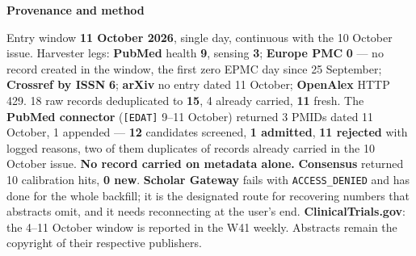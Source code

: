 \documentclass[10pt]{article}
\begin{document}


\vspace{2mm}

\begin{keybox}
{\sffamily\bfseries\footnotesize\color{Deep}Provenance and method}\\[1.2mm]
{\fontsize{7.2}{8.8}\selectfont
Entry window \textbf{11 October 2026}, single day, continuous with the 10 October issue.
Harvester legs: \textbf{PubMed} health \textbf{9}, sensing \textbf{3}; \textbf{Europe PMC} \textbf{0} ---
no record created in the window, the first zero EPMC day since 25 September; \textbf{Crossref by ISSN}
\textbf{6}; \textbf{arXiv} no entry dated 11 October; \textbf{OpenAlex} HTTP 429. 18 raw records
deduplicated to \textbf{15}, 4 already carried, \textbf{11} fresh. The \textbf{PubMed connector}
(\texttt{[EDAT]} 9--11 October) returned 3 PMIDs dated 11 October, 1 appended --- \textbf{12} candidates
screened, \textbf{1 admitted}, \textbf{11 rejected} with logged reasons, two of them duplicates of records
already carried in the 10 October issue. \textbf{No record carried on metadata alone.} \textbf{Consensus}
returned 10 calibration hits, \textbf{0 new}. \textbf{Scholar Gateway} fails with \texttt{ACCESS\_DENIED}
and has done for the whole backfill; it is the designated route for recovering numbers that abstracts
omit, and it needs reconnecting at the user's end. \textbf{ClinicalTrials.gov}: the 4--11 October window
is reported in the W41 weekly. Abstracts remain the copyright of their respective publishers.\par}
\end{keybox}
\end{document}
